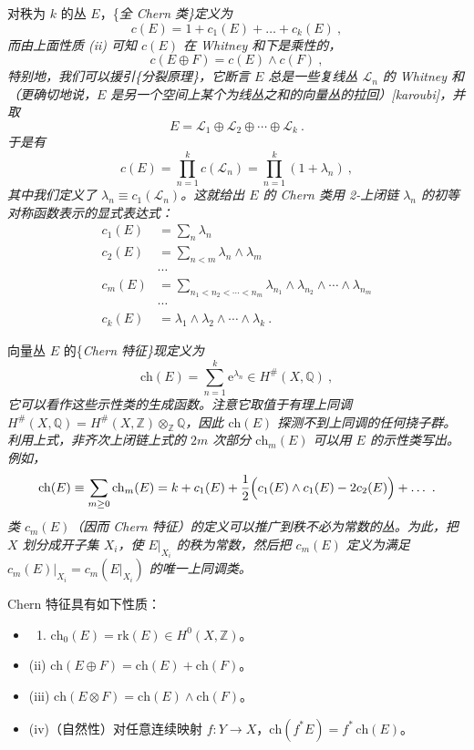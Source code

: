 \documentclass[11pt,a4paper]{ctexart}
\begin{document}
对秩为 \(k\) 的丛 \(E\)，\{\it 全 Chern 类\}定义为 \[c(E)=1+c_1(E)+\ldots+c_k(E)\ ,\] 而由上面性质 (ii) 可知 \(c(E)\) 在 Whitney 和下是乘性的， \[c(E\oplus F)=c(E)\wedge c(F) \ ,\] 特别地，我们可以援引\{\it 分裂原理\}，它断言 \(E\) 总是一些复线丛 \({\mathcal L}_n\) 的 Whitney 和（更确切地说，\(E\) 是另一个空间上某个为线丛之和的向量丛的拉回）[karoubi]，并取 \[E={\mathcal L}_1\oplus{\mathcal L}_2\oplus\cdots\oplus{\mathcal L}_k\ .\] 于是有 \[c(E)=\prod_{n=1}^kc({\mathcal L}_n)=\prod_{n=1}^k(1+\lambda_n)\ ,\] 其中我们定义了 \(\lambda_n\equiv c_1({\mathcal L}_n)\)。这就给出 \(E\) 的 Chern 类用 2-上闭链 \(\lambda_n\) 的初等对称函数表示的显式表达式： \[\begin{matrix}
c_1(E)&=\sum_n\lambda_n\\
c_2(E)&=\sum_{n<m}\lambda_n\wedge\lambda_m\\
&\cdots\\
c_m(E)&=\sum_{n_1<n_2<\cdots<n_m}\lambda_{n_1}\wedge \lambda_{n_2}\wedge\cdots
\wedge \lambda_{n_m}\\
&\cdots\\
c_k(E)&=\lambda_1\wedge
\lambda_2\wedge\cdots\wedge \lambda_k\ .
\end{matrix}\]

向量丛 \(E\) 的\{\it Chern 特征\}现定义为 \[\mathrm{ch}(E)=\sum_{n=1}^k\mbox{e}^{\lambda_n}\in H^\#(X,{\mathbb{Q}})\ ,\] 它可以看作这些示性类的生成函数。注意它取值于有理上同调 \(H^\#(X,{\mathbb{Q}})=H^\#(X,{\mathbb{Z}})\otimes_{\mathbb{Z}}{\mathbb{Q}}\)，因此 \(\mathrm{ch}(E)\) 探测不到上同调的任何挠子群。利用上式，非齐次上闭链上式的 \(2m\) 次部分 \(\mathrm{ch}_m(E)\) 可以用 \(E\) 的示性类写出。例如， \[\mathrm{ch}(E)\equiv\sum_{m\geq0}\mathrm{ch}_m(E)=k+c_1(E)+\frac12\Bigl(c_1(E)\wedge c_1(E)
-2c_2(E)\Bigr)+\dots \ .\] 类 \(c_m(E)\)（因而 Chern 特征）的定义可以推广到秩不必为常数的丛。为此，把 \(X\) 划分成开子集 \(X_i\)，使 \(E|_{X_i}\) 的秩为常数，然后把 \(c_m(E)\) 定义为满足 \(c_m(E)|_{X_i}=c_m(E|_{X_i})\) 的唯一上同调类。

Chern 特征具有如下性质：

\begin{itemize}
\tightlist
\item
  \begin{enumerate}
  \def\labelenumi{(\roman{enumi})}
  \tightlist
  \item
    \(\mathrm{ch}_0(E)=\mathrm{rk}(E)\in H^0(X,{\mathbb{Z}})\)。
  \end{enumerate}
\item
  (ii) \(\mathrm{ch}(E\oplus F)=\mathrm{ch}(E)+\mathrm{ch}(F)\)。
\item
  (iii) \(\mathrm{ch}(E\otimes F)=\mathrm{ch}(E)\wedge\mathrm{ch}(F)\)。
\item
  (iv)（自然性）对任意连续映射 \(f:Y\rightarrow X\)，\(\mathrm{ch}(f^*E)=f^*\,\mathrm{ch}(E)\)。
\end{itemize}
\end{document}
